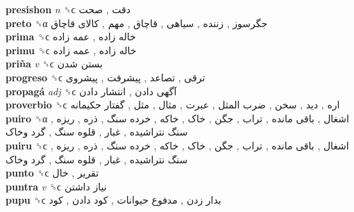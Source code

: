 \textbf{presishon} \emph{n}  ␝ϲ   دقت ,  صحت   \\
\textbf{preto} ␝α   جگرسوز ,  زننده ,  سیاهی ,  قاچاق ,  مهم ,  کالای قاچاق   \\
\textbf{prima} ␝ϲ   خاله زاده ,  عمه زاده   \\
\textbf{primu} ␝ϲ   خاله زاده ,  عمه زاده   \\
\textbf{priña} \emph{v}  ␝ϲ   بستن شدن   \\
\textbf{progreso} ␝ϲ   ترقی ,  تصاعد ,  پیشرفت ,  پیشروی   \\
\textbf{propagá} \emph{adj}  ␝ϲ   آگهی دادن ,  انتشار دادن   \\
\textbf{proverbio} ␝ϲ   اره ,  دید ,  سخن ,  ضرب المثل ,  عبرت ,  مثال ,  مثل ,  گفتار حکیمانه   \\
\textbf{puiro} ␝α   اشغال ,  باقی مانده ,  تراب ,  جگن ,  خاک ,  خاکه ,  خرده سنگ ,  ذره ,  ریزه ,  سنگ نتراشیده ,  غبار ,  قلوه سنگ ,  گرد وخاک   \\
\textbf{puiru} ␝ϲ   اشغال ,  باقی مانده ,  تراب ,  جگن ,  خاک ,  خاکه ,  خرده سنگ ,  ذره ,  ریزه ,  سنگ نتراشیده ,  غبار ,  قلوه سنگ ,  گرد وخاک   \\
\textbf{punto} ␝ϲ   تقریر ,  خال   \\
\textbf{puntra} \emph{v}  ␝ϲ   نیاز داشتن   \\
\textbf{pupu} ␝ϲ   بدار زدن ,  مدفوع حیوانات ,  کود دادن ,  کود   \\

